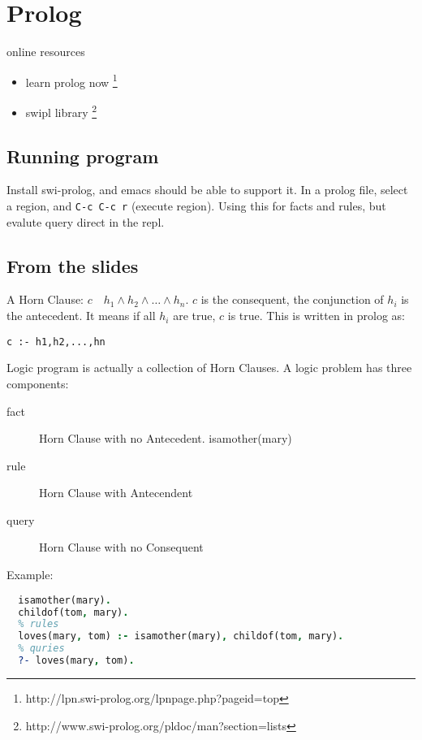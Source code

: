\section{Prolog}

online resources
\begin{itemize}
\item learn prolog now \footnote{http://lpn.swi-prolog.org/lpnpage.php?pageid=top}
\item swipl library \footnote{http://www.swi-prolog.org/pldoc/man?section=lists}
\end{itemize}

\subsection{Running program}

Install swi-prolog, and emacs should be able to support it.  In a
prolog file, select a region, and \texttt{C-c C-c r} (execute region).
Using this for facts and rules, but evalute query direct in the repl.

\subsection{From the slides}

A Horn Clause: $c \quad h_1 \wedge h_2 \wedge \ldots \wedge h_n$.
$c$ is the consequent, the conjunction of $h_i$ is the antecedent.
It means if all $h_i$ are true, $c$ is true.
This is written in prolog as:

\begin{lstlisting}
c :- h1,h2,...,hn
\end{lstlisting}

Logic program is actually a collection of Horn Clauses.
A logic problem has three components:
\begin{description}
\item [fact] Horn Clause with no Antecedent. isamother(mary)
\item [rule] Horn Clause with Antecendent
\item [query] Horn Clause with no Consequent
\end{description}

Example:

\begin{lstlisting}[language=prolog]
  % facts
  isamother(mary).
  childof(tom, mary).
  % rules
  loves(mary, tom) :- isamother(mary), childof(tom, mary).
  % quries
  ?- loves(mary, tom).
\end{lstlisting}

